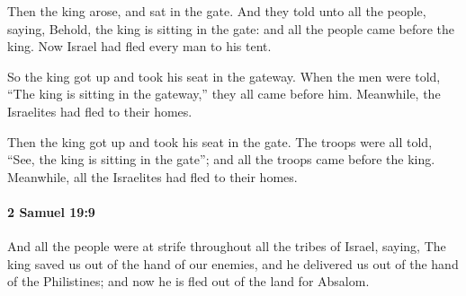 			\begin{versebox}
					\item[BHS] 
					\item[ASV] Then the king arose, and sat in the gate. And they told unto all the people, saying, Behold, the king is sitting in the gate: and all the people came before the king. Now Israel had fled every man to his tent.
					\item[NIV] So the king got up and took his seat in the gateway. When the men were told, “The king is sitting in the gateway,” they all came before him. Meanwhile, the Israelites had fled to their homes.
					\item[NRSV] Then the king got up and took his seat in the gate. The troops were all told, “See, the king is sitting in the gate”; and all the troops came before the king. Meanwhile, all the Israelites had fled to their homes.
			\end{versebox}

		\paragraph{2 Samuel 19:9} %
			\label{2SAMUEL-19-9}

			And all the people were at strife throughout all the tribes of Israel, saying, The king saved us out of the hand of our enemies, and he delivered us out of the hand of the Philistines; and now he is fled out of the land for Absalom.

